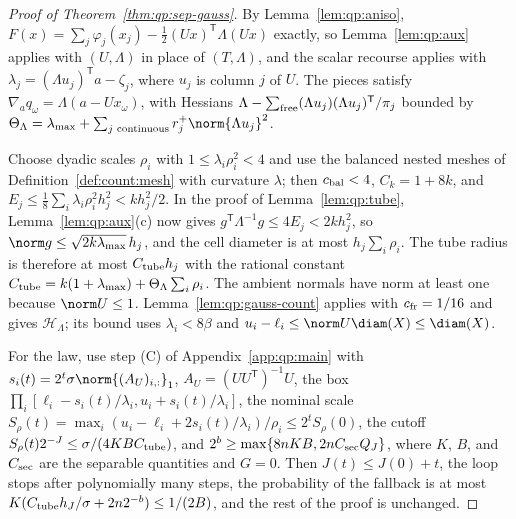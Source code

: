 \begin{proof}[Proof of Theorem~\ref{thm:qp:sep-gauss}]
By Lemma~\ref{lem:qp:aniso}, $F(x)=\sum_j\varphi_j(x_j)-\frac12(Ux)^{\mathsf T}\Lambda(Ux)$
exactly, so Lemma~\ref{lem:qp:aux} applies with $(U,\Lambda)$ in place of
$(T,\Lambda)$, and the scalar recourse applies with
$\lambda_j=(\Lambda u_j)^{\mathsf T} a-\zeta_j$, where $u_j$ is column $j$ of $U$. The
pieces satisfy $\nabla_aq_\omega=\Lambda(a-Ux_\omega)$, with Hessians
$\Lambda-\sum_{\rm free}(\Lambda u_j)(\Lambda u_j)^{\mathsf T}/\pi_j$ bounded by
$\Theta_\Lambda=\lambda_{\max}+\sum_{j\text{ continuous}}r_j^+\norm{\Lambda u_j}^2$.

Choose dyadic scales $\rho_i$ with $1\le\lambda_i\rho_i^2<4$ and use the
balanced nested meshes of Definition~\ref{def:count:mesh} with curvature
$\lambda$; then $c_{\rm bal}<4$, $C_k=1+8k$, and
$E_j\le\frac18\sum_i\lambda_i\rho_i^2h_j^2<kh_j^2/2$. In the proof of
Lemma~\ref{lem:qp:tube}, Lemma~\ref{lem:qp:aux}(c) now gives
$g^{\mathsf T}\Lambda^{-1}g\le4E_j<2kh_j^2$, so $\norm g\le\sqrt{2k\lambda_{\max}}\,h_j$,
and the cell diameter is at most $h_j\sum_i\rho_i$. The tube radius is
therefore at most $C_{\rm tube}h_j$ with the rational constant
$C_{\rm tube}=k(1+\lambda_{\max})+\Theta_\Lambda\sum_i\rho_i$. The ambient
normals have norm at least one because $\norm U\le1$. Lemma~\ref{lem:qp:gauss-count}
applies with $c_{\rm fr}=1/16$ and gives $\mathcal H_\Lambda$; its bound uses
$\lambda_i<8\beta$ and $u_i-\ell_i\le\norm U\diam(X)\le\diam(X)$.

For the law, use step (C) of Appendix~\ref{app:qp:main} with
$s_i(t)=2^t\sigma\norm{(A_U)_{i,:}}_1$, $A_U=(UU^{\mathsf T})^{-1}U$, the box
$\prod_i[\ell_i-s_i(t)/\lambda_i,u_i+s_i(t)/\lambda_i]$, the nominal scale
$S_\rho(t)=\max_i(u_i-\ell_i+2s_i(t)/\lambda_i)/\rho_i\le2^tS_\rho(0)$, the
cutoff $S_\rho(t)2^{-J}\le\sigma/(4KBC_{\rm tube})$, and
$2^b\ge\max\{8nKB,2nC_{\rm sec}Q_J\}$, where $K$, $B$, and $C_{\rm sec}$ are the
separable quantities and $G=0$. Then $J(t)\le J(0)+t$, the loop stops after
polynomially many steps, the probability of the fallback is at most
$K(C_{\rm tube}h_J/\sigma+2n2^{-b})\le1/(2B)$, and the rest of the proof is
unchanged.
\end{proof}
